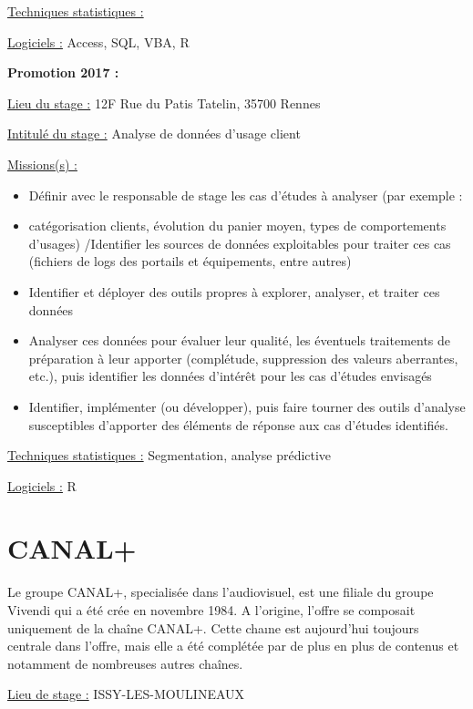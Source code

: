 \documentclass[
  letterpaper,
  DIV=11,
  numbers=noendperiod]{scrreprt}
\begin{document}
\uline{Techniques statistiques :}

\uline{Logiciels :} Access, SQL, VBA, R

\textbf{Promotion 2017 :}

\uline{Lieu du stage :} 12F Rue du Patis Tatelin, 35700 Rennes

\uline{Intitulé du stage :} Analyse de données d'usage client

\uline{Missions(s) :}

\begin{itemize}
\item
  Définir avec le responsable de stage les cas d'études à analyser (par
  exemple :
\item
  catégorisation clients, évolution du panier moyen, types de
  comportements d'usages) /Identifier les sources de données
  exploitables pour traiter ces cas (fichiers de logs des portails et
  équipements, entre autres)
\item
  Identifier et déployer des outils propres à explorer, analyser, et
  traiter ces données
\item
  Analyser ces données pour évaluer leur qualité, les éventuels
  traitements de préparation à leur apporter (complétude, suppression
  des valeurs aberrantes, etc.), puis identifier les données d'intérêt
  pour les cas d'études envisagés
\item
  Identifier, implémenter (ou développer), puis faire tourner des outils
  d'analyse susceptibles d'apporter des éléments de réponse aux cas
  d'études identifiés.
\end{itemize}

\uline{Techniques statistiques :} Segmentation, analyse prédictive

\uline{Logiciels :} R

\hypertarget{canal}{%
\section{\texorpdfstring{\textbf{CANAL+}}{CANAL+}}\label{canal}}

Le groupe CANAL+, specialisée dans l'audiovisuel, est une filiale du
groupe Vivendi qui a été crée en novembre 1984. A l'origine, l'offre se
composait uniquement de la chaîne CANAL+. Cette chaıne est aujourd'hui
toujours centrale dans l'offre, mais elle a été complétée par de plus en
plus de contenus et notamment de nombreuses autres chaînes.

\uline{Lieu de stage :} ISSY-LES-MOULINEAUX
\end{document}
